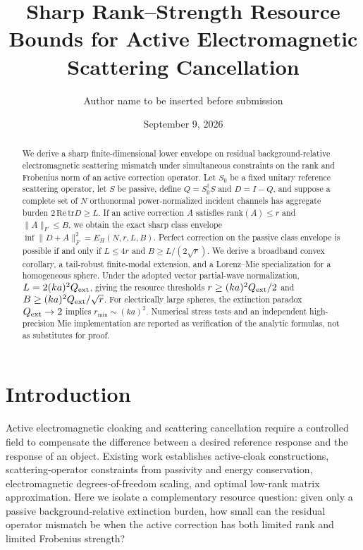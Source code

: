 \documentclass[aps,pra,onecolumn,superscriptaddress,nofootinbib]{revtex4-2}
\begin{document}
\title{Sharp Rank--Strength Resource Bounds for Active Electromagnetic Scattering Cancellation}
\author{Author name to be inserted before submission}
\date{September 9, 2026}

\begin{abstract}
We derive a sharp finite-dimensional lower envelope on residual background-relative electromagnetic scattering mismatch under simultaneous constraints on the rank and Frobenius norm of an active correction operator. Let $S_0$ be a fixed unitary reference scattering operator, let $S$ be passive, define $Q=S_0^\dagger S$ and $D=I-Q$, and suppose a complete set of $N$ orthonormal power-normalized incident channels has aggregate burden $2\,\mathrm{Re}\,\mathrm{tr}D\ge L$. If an active correction $A$ satisfies $\mathrm{rank}(A)\le r$ and $\|A\|_F\le B$, we obtain the exact sharp class envelope $\inf\|D+A\|_F^2=E_H(N,r,L,B)$. Perfect correction on the passive class envelope is possible if and only if $L\le4r$ and $B\ge L/(2\sqrt r)$. We derive a broadband convex corollary, a tail-robust finite-modal extension, and a Lorenz--Mie specialization for a homogeneous sphere. Under the adopted vector partial-wave normalization, $L=2(ka)^2Q_{\rm ext}$, giving the resource thresholds $r\ge (ka)^2Q_{\rm ext}/2$ and $B\ge (ka)^2Q_{\rm ext}/\sqrt r$. For electrically large spheres, the extinction paradox $Q_{\rm ext}\to2$ implies $r_{\min}\sim(ka)^2$. Numerical stress tests and an independent high-precision Mie implementation are reported as verification of the analytic formulas, not as substitutes for proof.
\end{abstract}

\maketitle

\section{Introduction}
Active electromagnetic cloaking and scattering cancellation require a controlled field to compensate the difference between a desired reference response and the response of an object. Existing work establishes active-cloak constructions, scattering-operator constraints from passivity and energy conservation, electromagnetic degrees-of-freedom scaling, and optimal low-rank matrix approximation. Here we isolate a complementary resource question: given only a passive background-relative extinction burden, how small can the residual operator mismatch be when the active correction has both limited rank and limited Frobenius strength?
\end{document}
